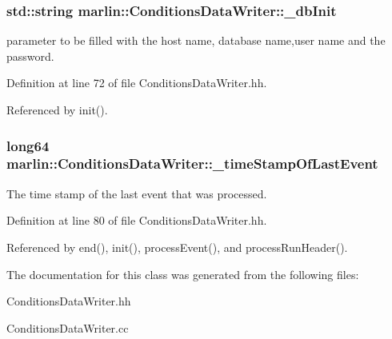 \subsubsection[{\_\-dbInit}]{\setlength{\rightskip}{0pt plus 5cm}std::string {\bf marlin::ConditionsDataWriter::\_\-dbInit}\hspace{0.3cm}{\ttfamily  [protected]}}\label{classmarlin_1_1ConditionsDataWriter_ad87dadf50a9e475515ea26bce299e449}


parameter to be filled with the host name, database name,user name and the password. 

Definition at line 72 of file ConditionsDataWriter.hh.

Referenced by init().
\subsubsection[{\_\-timeStampOfLastEvent}]{\setlength{\rightskip}{0pt plus 5cm}long64 {\bf marlin::ConditionsDataWriter::\_\-timeStampOfLastEvent}\hspace{0.3cm}{\ttfamily  [protected]}}\label{classmarlin_1_1ConditionsDataWriter_af2c6e1b189e2f665f8ef6beb7ad9c10b}


The time stamp of the last event that was processed. 

Definition at line 80 of file ConditionsDataWriter.hh.

Referenced by end(), init(), processEvent(), and processRunHeader().

The documentation for this class was generated from the following files:\begin{DoxyCompactItemize}
\item 
ConditionsDataWriter.hh\item 
ConditionsDataWriter.cc\end{DoxyCompactItemize}

